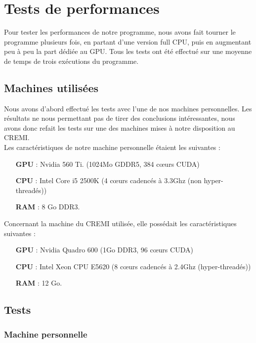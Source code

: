 \section{Tests de performances}

Pour tester les performances de notre programme, nous avons fait tourner le programme plusieurs fois, en partant d'une version full CPU, puis en augmentant peu à peu la part dédiée au GPU. Tous les tests ont été effectué sur une moyenne de temps de trois exécutions du programme.

	\subsection{Machines utilisées}

	Nous avons d'abord effectué les tests avec l'une de nos machines personnelles. Les résultats ne nous permettant pas de tirer des conclusions intéressantes, nous avons donc refait les tests sur une des machines mises à notre disposition au CREMI.\\

	Les caractéristiques de notre machine personnelle étaient les suivantes :
	\begin{itemize}
		\item[\textbf{GPU}] : Nvidia 560 Ti. (1024Mo GDDR5, 384 c\oe{}urs CUDA)
		\item[\textbf{CPU}] : Intel Core i5 2500K (4 c\oe{}urs cadencés à 3.3Ghz (non hyper-threadés))	
		\item[\textbf{RAM}] : 8 Go DDR3.\\
		\end{itemize}
		
	Concernant la machine du CREMI utilisée, elle possédait les caractéristiques suivantes :
	\begin{itemize}
		\item[\textbf{GPU}] : Nvidia Quadro 600 (1Go DDR3, 96 c\oe{}urs CUDA)
		\item[\textbf{CPU}] : Intel Xeon CPU E5620 (8 c\oe{}urs cadencés à 2.4Ghz (hyper-threadés))
		\item[\textbf{RAM}] : 12 Go.
	\end{itemize}

	\subsection{Tests}
	
	\subsubsection{Machine personnelle}
	
